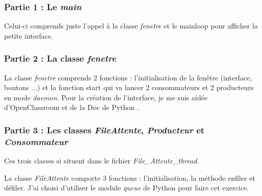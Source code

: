 \documentclass{article}
\begin{document}
\subsubsection{Partie 1 : Le \textit{main}}
Celui-ci comprends juste l'appel à la classe \textit{fenetre} et le mainloop pour afficher la petite interface.

\subsubsection{Partie 2 : La classe \textit{fenetre}}
La classe \textit{fenetre} comprends 2 fonctions : l'initialisation de la fenêtre (interface, boutons ...) et la fonction start qui va lancer 2 consommateurs et 2 producteurs en mode \textit{daemon}.
Pour la création de l'interface, je me suis aidée d'OpenClassroom \cite{OC_tkinter} et de la Doc de Python \cite{doc_python}.

\subsubsection{Partie 3 : Les classes \textit{FileAttente}, \textit{Producteur} et \textit{Consommateur} }

Ces trois classes si situent dans le fichier \textit{File\_Attente\_thread}.

La classe \textit{FileAttente} comporte 3 fonctions : l'initialisation, la méthode enfiler et défiler. J'ai choisi d'utiliser le module \textit{queue} de Python pour faire cet exercice.
\end{document}
